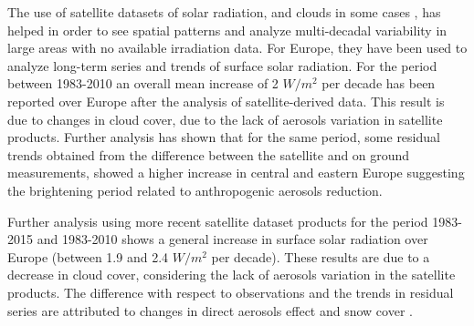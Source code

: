 The use of satellite datasets of solar radiation, and clouds in some cases \cite*{Pfeifroth2017}, has helped in order to see spatial patterns and analyze multi-decadal variability in large areas with no available irradiation data. For Europe, they have been used to analyze long-term series and trends of surface solar radiation. For the period between 1983-2010 an overall mean increase of 2 $W/m^2$ per decade has been reported over Europe after the analysis of satellite-derived data. This result is due to changes in cloud cover, due to the lack of aerosols variation in satellite products. Further analysis has shown that for the same period, some residual trends obtained from the difference between the satellite and on ground measurements, showed a higher increase in central and eastern Europe suggesting the brightening period related to anthropogenic aerosols reduction.

Further analysis using more recent satellite dataset products for the period 1983-2015 and 1983-2010 shows a general increase in surface solar radiation over Europe (between 1.9 and 2.4 $W/m^2$ per decade). These results are  due to a decrease in cloud cover, considering the lack of aerosols variation in the satellite products. The difference with respect to observations and the trends in residual series are attributed to changes in direct aerosols effect and snow cover \cite*{Pfeifroth2018, Sanchez-Lorenzo2017}. 









